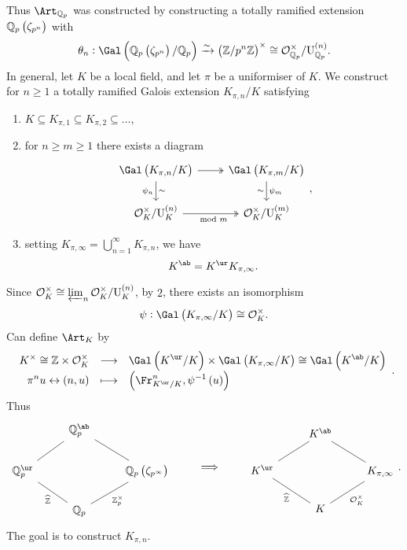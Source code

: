 Thus $ \Art_{\QQ_p} $ was constructed by constructing a totally ramified extension $ \QQ_p\br{\zeta_{p^n}} $ with
$$ \theta_n : \Gal\br{\QQ_p\br{\zeta_{p^n}} / \QQ_p} \xrightarrow{\sim} \br{\ZZ / p^n\ZZ}^\times \cong \OOO_{\QQ_p}^\times / \U_{\QQ_p}^{\br{n}}. $$
In general, let $ K $ be a local field, and let $ \pi $ be a uniformiser of $ K $. We construct for $ n \ge 1 $ a totally ramified Galois extension $ K_{\pi, n} / K $ satisfying
\begin{enumerate}
\item $ K \subseteq K_{\pi, 1} \subseteq K_{\pi, 2} \subseteq \dots $,
\item for $ n \ge m \ge 1 $ there exists a diagram
$$
\begin{tikzcd}
\Gal\br{K_{\pi, n} / K} \arrow[twoheadrightarrow]{r} \arrow{d}{\sim}[swap]{\psi_n} & \Gal\br{K_{\pi, m} / K} \arrow{d}{\psi_m}[swap]{\sim} \\
\OOO_K^\times / \U_K^{\br{n}} \arrow[twoheadrightarrow]{r}[swap]{\mod m} & \OOO_K^\times / \U_K^{\br{m}}
\end{tikzcd},
$$
\item setting $ K_{\pi, \infty} = \bigcup_{n = 1}^\infty K_{\pi, n} $, we have
$$ K^{\ab} = K^{\ur}K_{\pi, \infty}. $$
\end{enumerate}
Since $ \OOO_K^\times \cong \varprojlim_n \OOO_K^\times / \U_K^{\br{n}} $, by $ 2 $, there exists an isomorphism
$$ \psi : \Gal\br{K_{\pi, \infty} / K} \cong \OOO_K^\times. $$
Can define $ \Art_K $ by
$$ \function{K^\times \cong \ZZ \times \OOO_K^\times}{\Gal\br{K^{\ur} / K} \times \Gal\br{K_{\pi, \infty} / K} \cong \Gal\br{K^{\ab} / K}}{\pi^nu \leftrightarrow \br{n, u}}{\br{\Fr_{K^{\ur} / K}^n, \psi^{-1}\br{u}}}. $$
Thus
$$
\begin{tikzcd}
& \QQ_p^{\ab} \arrow[dash]{dl} \arrow[dash]{dr} & \\
\QQ_p^{\ur} \arrow[dash]{dr}[swap]{\widehat{\ZZ}} & & \QQ_p\br{\zeta_{p^\infty}} \arrow[dash]{dl}{\ZZ_p^\times} \\
& \QQ_p &
\end{tikzcd}
\qquad \implies \qquad
\begin{tikzcd}
& K^{\ab} \arrow[dash]{dl} \arrow[dash]{dr} & \\
K^{\ur} \arrow[dash]{dr}[swap]{\widehat{\ZZ}} & & K_{\pi, \infty} \arrow[dash]{dl}{\OOO_K^\times} \\
& K &
\end{tikzcd}.
$$
The goal is to construct $ K_{\pi, n} $.

\pagebreak

